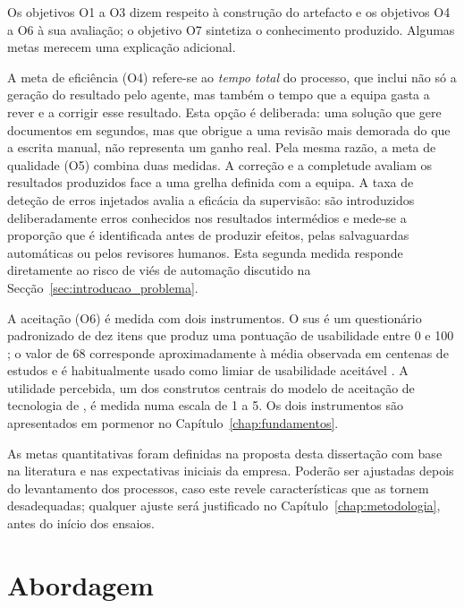 Os objetivos O1 a O3 dizem respeito à construção do artefacto e os objetivos O4 a O6 à sua avaliação; o objetivo O7 sintetiza o conhecimento produzido. Algumas metas merecem uma explicação adicional.

A meta de eficiência (O4) refere-se ao \emph{tempo total} do processo, que inclui não só a geração do resultado pelo agente, mas também o tempo que a equipa gasta a rever e a corrigir esse resultado. Esta opção é deliberada: uma solução que gere documentos em segundos, mas que obrigue a uma revisão mais demorada do que a escrita manual, não representa um ganho real. Pela mesma razão, a meta de qualidade (O5) combina duas medidas. A correção e a completude avaliam os resultados produzidos face a uma grelha definida com a equipa. A taxa de deteção de erros injetados avalia a eficácia da supervisão: são introduzidos deliberadamente erros conhecidos nos resultados intermédios e mede-se a proporção que é identificada antes de produzir efeitos, pelas salvaguardas automáticas ou pelos revisores humanos. Esta segunda medida responde diretamente ao risco de viés de automação discutido na Secção~\ref{sec:introducao_problema}.

A aceitação (O6) é medida com dois instrumentos. O \gls{sus} é um questionário padronizado de dez itens que produz uma pontuação de usabilidade entre 0 e 100 \parencite{brooke1996sus}; o valor de 68 corresponde aproximadamente à média observada em centenas de estudos e é habitualmente usado como limiar de usabilidade aceitável \parencite{bangor2009determining,sauro2011practical}. A utilidade percebida, um dos construtos centrais do modelo de aceitação de tecnologia de \textcite{davis1989perceived}, é medida numa escala de 1 a 5. Os dois instrumentos são apresentados em pormenor no Capítulo~\ref{chap:fundamentos}.

As metas quantitativas foram definidas na proposta desta dissertação com base na literatura e nas expectativas iniciais da empresa. Poderão ser ajustadas depois do levantamento dos processos, caso este revele características que as tornem desadequadas; qualquer ajuste será justificado no Capítulo~\ref{chap:metodologia}, antes do início dos ensaios.

\section{Abordagem}
\label{sec:introducao_abordagem}


